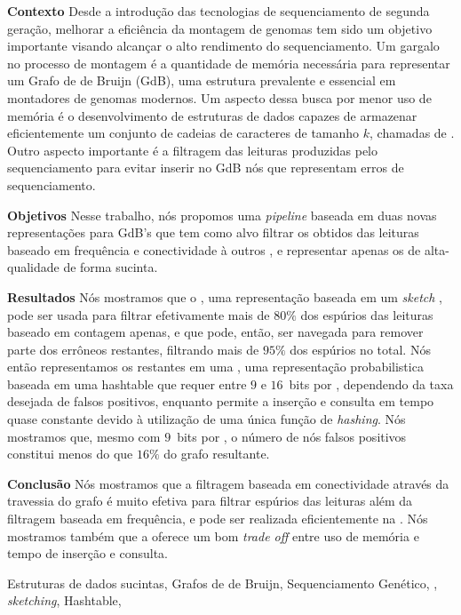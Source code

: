 \resumo

\textbf{Contexto} Desde a introdução das tecnologias de sequenciamento de segunda geração, melhorar a eficiência da montagem de genomas tem sido um objetivo importante visando alcançar o alto rendimento do sequenciamento. Um gargalo no processo de montagem é a quantidade de memória necessária para representar um Grafo de de Bruijn (GdB), uma estrutura prevalente e essencial em montadores de genomas modernos. Um aspecto dessa busca por menor uso de memória é o desenvolvimento de estruturas de dados capazes de armazenar eficientemente um conjunto de cadeias de caracteres de tamanho $k$, chamadas de . Outro aspecto importante é a filtragem das leituras produzidas pelo sequenciamento para evitar inserir no GdB nós que representam erros de sequenciamento.

\textbf{Objetivos} Nesse trabalho, nós propomos uma \emph{pipeline} baseada em duas novas representações para GdB's que tem como alvo filtrar os  obtidos das leituras baseado em frequência e conectividade à outros , e representar apenas os  de alta-qualidade de forma sucinta.

\textbf{Resultados} Nós mostramos que o \dBCM, uma representação baseada em um \emph{sketch} \cm, pode ser usada para filtrar efetivamente mais de $80\%$ dos  espúrios das leituras baseado em contagem apenas, e que pode, então, ser navegada para remover parte dos  errôneos restantes, filtrando mais de $95\%$ dos  espúrios no total. Nós então representamos os  restantes em uma \dBHT, uma representação probabilistica baseada em uma hashtable que requer entre $9$ e $16$~bits por \kmer, dependendo da taxa desejada de falsos positivos, enquanto permite a inserção e consulta em tempo quase constante devido à utilização de uma única função de \emph{hashing}. Nós mostramos que, mesmo com $9$~bits por \kmer, o número de nós falsos positivos constitui menos do que $16\%$ do grafo resultante.

\textbf{Conclusão} Nós mostramos que a filtragem baseada em conectividade através da travessia do grafo é muito efetiva para filtrar  espúrios das leituras além da filtragem baseada em frequência, e pode ser realizada eficientemente na \dBCM. Nós mostramos também que a \dBHT oferece um bom \emph{trade off} entre uso de memória e tempo de inserção e consulta.

\begin{keywords}
Estruturas de dados sucintas, Grafos de de Bruijn, Sequenciamento Genético, , \emph{sketching}, Hashtable, \cm
\end{keywords}